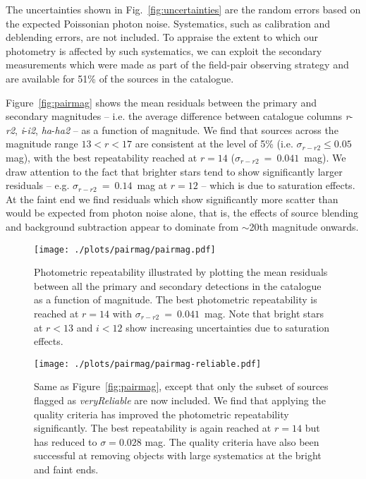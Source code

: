 \documentclass[useAMS,usenatbib]{mn2e}
\begin{document}
The uncertainties shown in Fig.~\ref{fig:uncertainties}
are the random errors based on the expected Poissonian photon noise.
Systematics, such as calibration and deblending errors,
are not included.
To appraise the extent to which our photometry is affected
by such systematics, we can exploit the
secondary measurements which were made as part of the
field-pair observing strategy and are available for 51\%
of the sources in the catalogue.

Figure~\ref{fig:pairmag} shows the mean residuals between
the primary and secondary magnitudes
-- i.e. the average difference between catalogue columns \emph{r}-\emph{r2},
\emph{i}-\emph{i2}, \emph{ha}-\emph{ha2} -- as a function of magnitude.
We find that sources across the magnitude range 
$13 < r < 17$ are consistent at the level of 5\%
(i.e. $\sigma_{r-r2} \le 0.05$ mag),
with the best repeatability
reached at $r=14$ ($\sigma_{r-r2}~=~0.041$~mag).
We draw attention to the fact that brighter stars
tend to show significantly larger residuals
-- e.g. $\sigma_{r-r2}~=~0.14$~mag at $r=12$ --
which is due to saturation effects.
At the faint end we find residuals which
show significantly more scatter than would be expected
from photon noise alone, that is,
the effects of source blending and background subtraction
appear to dominate from $\sim$20th magnitude onwards.

\begin{figure*}
    \vspace{1cm}
    \texttt{[image: ./plots/pairmag/pairmag.pdf]} 
    \caption{Photometric repeatability illustrated by plotting
             the mean residuals between all the primary and secondary detections
             in the catalogue as a function of magnitude.
             The best photometric repeatability is reached at $r=14$
             with $\sigma_{r-r2}~=~0.041$~mag.
             Note that bright stars at $r<13$ and $i<12$ 
             show increasing uncertainties due to saturation effects.}
    \label{fig:pairmag}
    \vspace{1cm}
    \texttt{[image: ./plots/pairmag/pairmag-reliable.pdf]} 
    \caption{Same as Figure~\ref{fig:pairmag},
    except that only the subset of sources
    flagged as \emph{veryReliable} are now included.
    We find that applying the quality criteria
    has improved the photometric repeatability significantly.
    The best repeatability is again reached at $r=14$
    but has reduced to $\sigma=0.028$ mag.
    The quality criteria have also been successful
    at removing objects with large systematics at the bright
    and faint ends.}
    \label{fig:pairmag_reliable}
\end{figure*}
\end{document}
